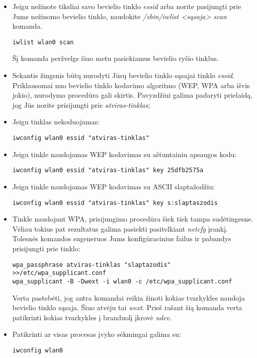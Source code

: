\begin{itemize}
    \item Jeigu nežinote tiksliai savo bevielio tinklo \textsl{essid}
      arba norite pasijungti prie Jums nežinomo bevielio tinklo,
      naudokite \textsl{/sbin/iwlist <sąsaja> scan} komanda. 
\begin{verbatim}
iwlist wlan0 scan
\end{verbatim}
      Šį komanda peržvelgs šiuo metu pasiekiamus bevielio ryšio
      tinklus.
    \item Sekantis žingsnis būtų nurodyti Jūsų bevielio tinklo sąsajai
      tinklo \textsl{essid}. Priklausomai nuo bevielio tinklo kodavimo
      algoritmo (WEP, WPA arba išvis jokio), nurodymo procedūra gali
      skirtis. Pavyzdžiui galima padaryti prielaidą, jog Jūs norite
      prisijungti prie \textsl{atviras-tinklas};
    \item Jeigu tinklas nekoduojamas:
\begin{verbatim}
iwconfig wlan0 essid "atviras-tinklas"
\end{verbatim}
    \item Jeigu tinkle naudojamas WEP kodavimas su aštuntainiu
      apsaugos kodu:
\begin{verbatim}
iwconfig wlan0 essid "atviras-tinklas" key 25dfb2575a
\end{verbatim}
    \item Jeigu tinkle naudojamas WEP kodavimas su ASCII slaptažodžiu:
\begin{verbatim}
iwconfig wlan0 essid "atviras-tinklas" key s:slaptaszodis
\end{verbatim}
    \item Tinkle naudojant WPA, prisijungimo procedūra šiek tiek
      tampa sudėtingesne. Vėliau tokius pat rezultatus galima pasiekti
      pasitelkiant \textsl{netcfg} įrankį. Tolesnės komandos sugeneruos Jums
      konfigūracinius failus ir pabandys prisijungti prie tinklo:
\begin{verbatim}
wpa_passphrase atviras-tinklas "slaptazodis" >>/etc/wpa_supplicant.conf
wpa_supplicant -B -Dwext -i wlan0 -c /etc/wpa_supplicant.conf
\end{verbatim}
      Verta pastebėti, jog antra komandai reikia žinoti kokias
      tvarkykles naudoja bevielio tinklo sąsaja. Šiuo atvėju tai
      \textsl{wext}. Prieš rašant šią komanda verta patikrinti kokias
      tvarkykles į branduolį įkrovė \textsl{udev}.
    \item Patikrinti ar visas procesas įvyko sėkmingai galima su:
\begin{verbatim}
iwconfig wlan0

\end{verbatim}
\end{itemize}
